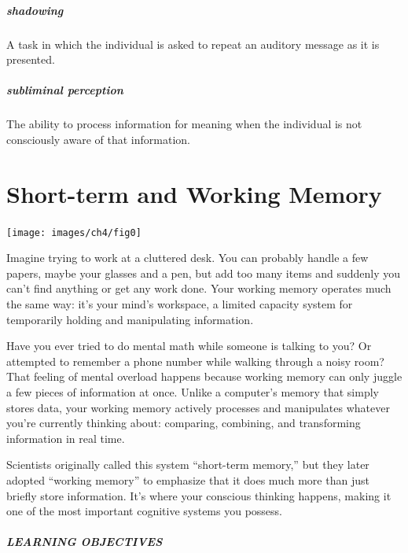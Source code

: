 \documentclass[
]{krantz}
\begin{document}
\paragraph*{shadowing}\label{shadowing}

A task in which the individual is asked to repeat an auditory message as it is presented.

\paragraph*{subliminal perception}\label{subliminal-perception-1}

The ability to process information for meaning when the individual is not consciously aware of that information.

\chapter{Short-term and Working Memory}\label{working-memory-chapter}

\begin{center}\texttt{[image: images/ch4/fig0]} \end{center}

Imagine trying to work at a cluttered desk. You can probably handle a few papers, maybe your glasses and a pen, but add too many items and suddenly you can't find anything or get any work done. Your working memory operates much the same way: it's your mind's workspace, a limited capacity system for temporarily holding and manipulating information.

Have you ever tried to do mental math while someone is talking to you? Or attempted to remember a phone number while walking through a noisy room? That feeling of mental overload happens because working memory can only juggle a few pieces of information at once. Unlike a computer's memory that simply stores data, your working memory actively processes and manipulates whatever you're currently thinking about: comparing, combining, and transforming information in real time.

Scientists originally called this system ``short-term memory,'' but they later adopted ``working memory'' to emphasize that it does much more than just briefly store information. It's where your conscious thinking happens, making it one of the most important cognitive systems you possess.

\paragraph*{LEARNING OBJECTIVES}\label{learning-objectives-3}
\end{document}

